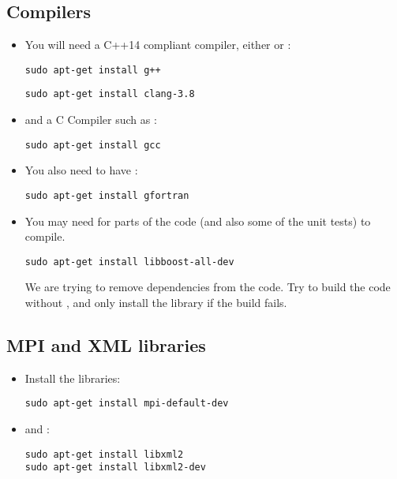 \documentclass[11pt,fleqn]{book} %
\begin{document}
\subsection{Compilers}
\begin{itemize}
  \item You will need a C++14 compliant compiler, either  or :
\begin{lstlisting}[backgroundcolor=\color{background}]
sudo apt-get install g++
\end{lstlisting}
\begin{lstlisting}[backgroundcolor=\color{background}]
sudo apt-get install clang-3.8
\end{lstlisting}

  \item and a C Compiler such as :
\begin{lstlisting}[backgroundcolor=\color{background}]
sudo apt-get install gcc
\end{lstlisting}

  \item You also need to have :
\begin{lstlisting}[backgroundcolor=\color{background}]
sudo apt-get install gfortran
\end{lstlisting}

  \item You may need  for parts of the code (and also some of the unit tests) to compile.
\begin{lstlisting}[backgroundcolor=\color{background}]
sudo apt-get install libboost-all-dev
\end{lstlisting}
        \begin{NoteBox}
        We are trying to remove  dependencies from the code.  Try to build the code
        without , and only install the library if the build fails.
        \end{NoteBox}
\end{itemize}

\subsection{MPI and XML libraries}
\begin{itemize}
  \item Install the  libraries:
\begin{lstlisting}[backgroundcolor=\color{background}]
sudo apt-get install mpi-default-dev
\end{lstlisting}

  \item and :
\begin{lstlisting}[backgroundcolor=\color{background}]
sudo apt-get install libxml2
sudo apt-get install libxml2-dev
\end{lstlisting}
\end{itemize}
\end{document}
